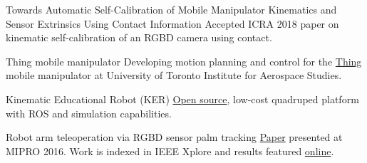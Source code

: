 \documentclass{tccv}
\begin{document}
\begin{yearlist2}  
  
\item{}
     {{\small Towards Automatic Self-Calibration of Mobile Manipulator Kinematics and Sensor Extrinsics Using Contact Information}}
     {{\small Accepted ICRA 2018 paper on kinematic self-calibration of an RGBD camera using contact.}}

\item{}
     {Thing mobile manipulator}
     {{\small Developing motion planning and control for the \href{https://youtu.be/l_MliB_B_UQ}{Thing} mobile manipulator at University of Toronto Institute for Aerospace Studies.}}
     
\item{}
     {Kinematic Educational Robot (KER)}
     {{\small \href{https://github.com/filipmrc/ker}{Open source}, low-cost quadruped platform with ROS and simulation capabilities.}}

\item{}
     {Robot arm teleoperation via RGBD sensor palm tracking}
     { {\small \href{http://ieeexplore.ieee.org/document/7522303/}{Paper} presented at MIPRO 2016. Work is indexed in IEEE Xplore and results featured \href{https://youtu.be/exf7TUviuSg}{online}.}}

\end{yearlist2}
\end{document}
